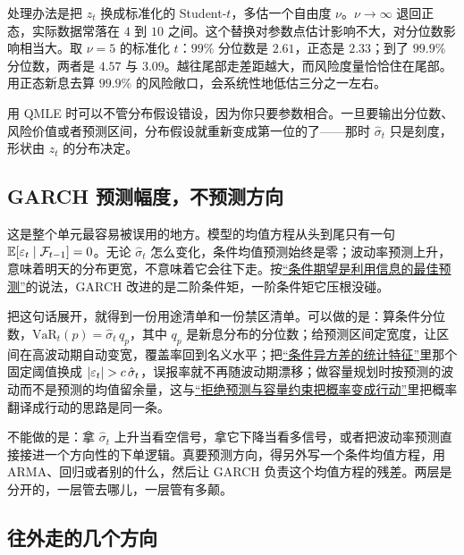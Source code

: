 处理办法是把 \(z_t\) 换成标准化的 Student-\(t\)，多估一个自由度 \(\nu\)。\(\nu\to\infty\) 退回正态，实际数据常落在 \(4\) 到 \(10\) 之间。这个替换对参数点估计影响不大，对分位数影响相当大。取 \(\nu=5\) 的标准化 \(t\)：\(99\%\) 分位数是 \(2.61\)，正态是 \(2.33\)；到了 \(99.9\%\) 分位数，两者是 \(4.57\) 与 \(3.09\)。越往尾部走差距越大，而风险度量恰恰住在尾部。用正态新息去算 \(99.9\%\) 的风险敞口，会系统性地低估三分之一左右。

\begin{remark}
用 QMLE 时可以不管分布假设错设，因为你只要参数相合。一旦要输出分位数、风险价值或者预测区间，分布假设就重新变成第一位的了——那时 \(\hat\sigma_t\) 只是刻度，形状由 \(z_t\) 的分布决定。
\end{remark}

\subsection{GARCH 预测幅度，不预测方向}

这是整个单元最容易被误用的地方。模型的均值方程从头到尾只有一句 \(\mathbb{E}[\varepsilon_t\mid\mathcal F_{t-1}]=0\)。无论 \(\hat\sigma_t\) 怎么变化，条件均值预测始终是零；波动率预测上升，意味着明天的分布更宽，不意味着它会往下走。按\hyperref[sec:05-Probability/04-Expectation-and-Moments/04]{``条件期望是利用信息的最佳预测''}的说法，GARCH 改进的是二阶条件矩，一阶条件矩它压根没碰。

把这句话展开，就得到一份用途清单和一份禁区清单。可以做的是：算条件分位数，\(\text{VaR}_{t}(p)=\hat\sigma_t\,q_p\)，其中 \(q_p\) 是新息分布的分位数；给预测区间定宽度，让区间在高波动期自动变宽，覆盖率回到名义水平；把\hyperref[sec:11-Mathematical-Statistics/10-GARCH-and-Volatility/01]{``条件异方差的统计特征''}里那个固定阈值换成 \(\abs{\varepsilon_t}>c\,\hat\sigma_t\)，误报率就不再随波动期漂移；做容量规划时按预测的波动而不是预测的均值留余量，这与\hyperref[sec:11-Mathematical-Statistics/07-Statistical-Decision-and-Reliable-Prediction/06]{``拒绝预测与容量约束把概率变成行动''}里把概率翻译成行动的思路是同一条。

不能做的是：拿 \(\hat\sigma_t\) 上升当看空信号，拿它下降当看多信号，或者把波动率预测直接接进一个方向性的下单逻辑。真要预测方向，得另外写一个条件均值方程，用 ARMA、回归或者别的什么，然后让 GARCH 负责这个均值方程的残差。两层是分开的，一层管去哪儿，一层管有多颠。

\subsection{往外走的几个方向}

